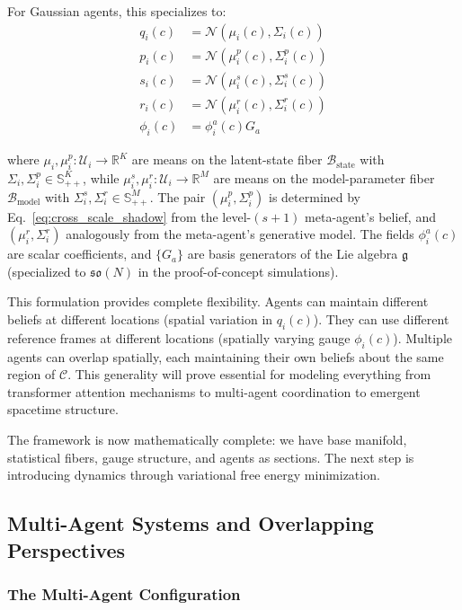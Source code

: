\documentclass[11pt]{article}
\begin{document}
For Gaussian agents, this specializes to:
\begin{align}
q_i(c) &= \mathcal{N}(\mu_i(c), \Sigma_i(c)) \\
p_i(c) &= \mathcal{N}(\mu_i^p(c), \Sigma_i^p(c)) \\
s_i(c) &= \mathcal{N}(\mu_i^s(c), \Sigma_i^s(c)) \\
r_i(c) &= \mathcal{N}(\mu_i^r(c), \Sigma_i^r(c)) \\
\phi_i(c) &= \phi_i^a(c) G_a
\end{align}

where $\mu_i, \mu_i^p: \mathcal{U}_i \to \mathbb{R}^K$ are means on the latent-state fiber $\mathcal{B}_{\mathrm{state}}$ with $\Sigma_i, \Sigma_i^p \in \mathbb{S}^K_{++}$, while $\mu_i^s, \mu_i^r: \mathcal{U}_i \to \mathbb{R}^M$ are means on the model-parameter fiber $\mathcal{B}_{\mathrm{model}}$ with $\Sigma_i^s, \Sigma_i^r \in \mathbb{S}^M_{++}$. The pair $(\mu_i^p, \Sigma_i^p)$ is determined by Eq.~\eqref{eq:cross_scale_shadow} from the level-$(s{+}1)$ meta-agent's belief, and $(\mu_i^r, \Sigma_i^r)$ analogously from the meta-agent's generative model. The fields $\phi_i^a(c)$ are scalar coefficients, and $\{G_a\}$ are basis generators of the Lie algebra $\mathfrak{g}$ (specialized to $\mathfrak{so}(N)$ in the proof-of-concept simulations).

This formulation provides complete flexibility. Agents can maintain different beliefs at different locations (spatial variation in $q_i(c)$). They can use different reference frames at different locations (spatially varying gauge $\phi_i(c)$). Multiple agents can overlap spatially, each maintaining their own beliefs about the same region of $\mathcal{C}$. This generality will prove essential for modeling everything from transformer attention mechanisms to multi-agent coordination to emergent spacetime structure.

The framework is now mathematically complete: we have base manifold, statistical fibers, gauge structure, and agents as sections. The next step is introducing dynamics through variational free energy minimization.

\subsection{Multi-Agent Systems and Overlapping Perspectives}

\subsubsection{The Multi-Agent Configuration}
\end{document}
